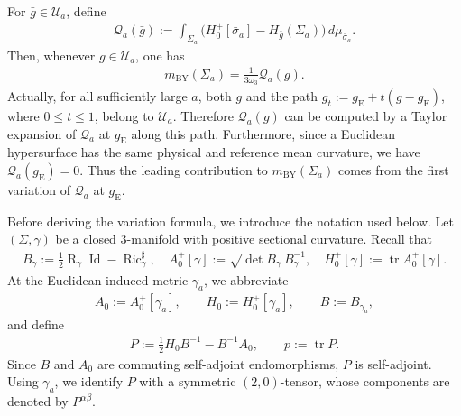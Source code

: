 \documentclass[10pt]{amsart}
\newcommand{\gE}{g_{\mathrm{E}}}
\newcommand{\tr}{\operatorname{tr}}
\newcommand{\Ric}{\operatorname{Ric}}
\newcommand{\Id}{\operatorname{Id}}
\newcommand{\Scal}{\operatorname{R}}
\newcommand{\BY}{\mathrm{BY}}
\theoremstyle{plain}
\theoremstyle{remark}
\begin{document}
	For
	$\bar g\in\mathcal U_a$, define
	\begin{align}
		\mathcal Q_a(\bar g)
		:=
		\int_{\Sigma_a}
		\bigl(
		H_0^+[\bar\sigma_a]
		-
		H_{\bar g}(\Sigma_a)
		\bigr)
		\,d\mu_{\bar\sigma_a}.
	\end{align}
	Then, whenever $g\in\mathcal U_a$, one has
	\begin{align*}
		m_{\BY}(\Sigma_a)
		=
		\frac{1}{3\omega_3}\mathcal Q_a(g).
	\end{align*}
	Actually, for all sufficiently large $a$, both $g$ and
	the path $g_t:=\gE+t(g-\gE)$, where $0\leq t\leq 1$, belong to $\mathcal U_a$. Therefore $\mathcal Q_a(g)$ can be computed by a
	Taylor expansion of $\mathcal Q_a$ at $\gE$ along this path. Furthermore, since a Euclidean hypersurface has the same physical and reference mean
	curvature, we have $\mathcal Q_a(\gE)=0$. Thus the leading contribution to $m_{\BY}(\Sigma_a)$ comes from the first
	variation of $\mathcal Q_a$ at $\gE$.
	
	Before deriving the variation formula, we introduce the notation used below.
	Let $(\Sigma,\gamma)$ be a closed $3$-manifold with positive sectional
	curvature. Recall that
	\begin{align*}
		B_\gamma
		:=
		\frac12\Scal_\gamma\Id-\Ric_\gamma^\sharp,
		\quad
		A_0^+[\gamma]
		:=
		\sqrt{\det B_\gamma}\,B_\gamma^{-1},
		\quad H_0^+[\gamma]
		:=
		\tr A_0^+[\gamma].
	\end{align*}
	At the Euclidean induced metric $\gamma_a$, we abbreviate
	\begin{align*}
		A_0:=A_0^+[\gamma_a],
		\qquad
		H_0:=H_0^+[\gamma_a],
		\qquad
		B:=B_{\gamma_a},
	\end{align*}
	and define
	\begin{align*}
		P
		:=
		\frac12H_0B^{-1}-B^{-1}A_0,
		\qquad
		p:=\tr P.
	\end{align*}
	Since $B$ and $A_0$ are commuting self-adjoint endomorphisms, $P$ is
	self-adjoint. Using $\gamma_a$, we identify $P$ with a symmetric
	$(2,0)$-tensor, whose components are denoted by $P^{\alpha\beta}$.
	
\end{document}
